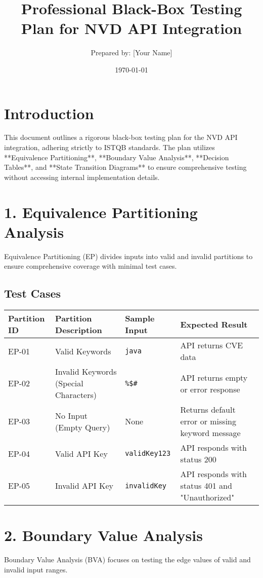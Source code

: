 \documentclass[a4paper,12pt]{article}
\title{\textbf{Professional Black-Box Testing Plan for NVD API Integration}}
\author{Prepared by: [Your Name]}
\date{\today}
\begin{document}
\maketitle

\section*{Introduction}
This document outlines a rigorous black-box testing plan for the NVD API integration, adhering strictly to ISTQB standards. The plan utilizes **Equivalence Partitioning**, **Boundary Value Analysis**, **Decision Tables**, and **State Transition Diagrams** to ensure comprehensive testing without accessing internal implementation details.

\newpage
\section*{1. Equivalence Partitioning Analysis}
Equivalence Partitioning (EP) divides inputs into valid and invalid partitions to ensure comprehensive coverage with minimal test cases.

\subsection*{Test Cases}
\begin{longtable}{|p{2cm}|p{5cm}|p{4cm}|p{4cm}|}
\hline
\textbf{Partition ID} & \textbf{Partition Description} & \textbf{Sample Input} & \textbf{Expected Result} \\
\hline
EP-01 & Valid Keywords & \texttt{java} & API returns CVE data \\
\hline
EP-02 & Invalid Keywords (Special Characters) & \texttt{\%\$\#} & API returns empty or error response \\
\hline
EP-03 & No Input (Empty Query) & None & Returns default error or missing keyword message \\
\hline
EP-04 & Valid API Key & \texttt{validKey123} & API responds with status 200 \\
\hline
EP-05 & Invalid API Key & \texttt{invalidKey} & API responds with status 401 and "Unauthorized" \\
\hline
\end{longtable}

\newpage
\section*{2. Boundary Value Analysis}
Boundary Value Analysis (BVA) focuses on testing the edge values of valid and invalid input ranges.
\end{document}
